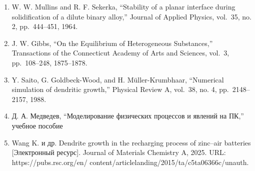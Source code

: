\documentclass[
  12pt,
  a4paper,
  DIV=11,
  numbers=noendperiod]{scrreprt}
\begin{document}
\begin{enumerate}
\def\labelenumi{\arabic{enumi}.}
\item
  W. W. Mullins and R. F. Sekerka, \enquote{Stability of a planar
  interface during solidification of a dilute binary alloy,} Journal of
  Applied Physics, vol.~35, no. 2, pp.~444--451, 1964.
\item
  J. W. Gibbs, \enquote{On the Equilibrium of Heterogeneous Substances,}
  Transactions of the Connecticut Academy of Arts and Sciences, vol.~3,
  pp.~108--248, 1875--1878.
\item
  Y. Saito, G. Goldbeck-Wood, and H. Müller-Krumbhaar,
  \enquote{Numerical simulation of dendritic growth,} Physical Review A,
  vol.~38, no. 4, pp.~2148--2157, 1988.
\item
  Д. А. Медведев, \enquote{Моделирование физических процессов и явлений
  на ПК,} учебное пособие
\item
  Wang K. и др. Dendrite growth in the recharging process of zinc--air
  batteries {[}Электронный ресурс{]}. Journal of Materials Chemistry A,
  2025. URL: https://pubs.rsc.org/en/
  content/articlelanding/2015/ta/c5ta06366c/unauth.
\end{enumerate}


\printbibliography
\end{document}
